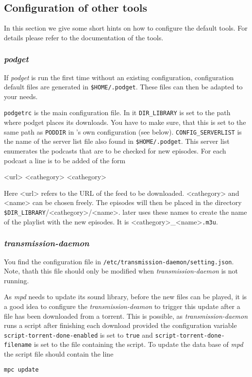 \subsection*{Configuration of other tools}
In this section we give some short hints on how to configure the
default tools. For details please refer to the documentation of the 
tools.
\subsubsection*{\emph{podget}}
If \emph{podget} is run the first time without an existing configuration, 
configuration default files are generated in  \texttt{\$HOME/.podget}.
These files can then be adapted to your needs.

\texttt{podgetrc} is the main configuration file.
In it \texttt{DIR\_LIBRARY} is set to the path where
podget places its downloads.
You have to make sure, that this is set to the  same path  as \texttt{PODDIR}
in  \podgetbt{}'s own configuration (see  below).
\texttt{CONFIG\_SERVERLIST} is the name of the server list file
also found in \texttt{\$HOME/.podget}.
This server list enumerates the podcasts that are 
to be checked for new episodes.
For each podcast a line is to be added of the form

\textless{}url\textgreater{} \textless{}cathegory\textgreater{} 
\textless{}cathegory\textgreater{} 

\noindent\sloppy
Here \textless{}url\textgreater{} refers to the URL of the  feed to be downloaded. 
\textless{}cathegory\textgreater{} and \textless{}name\textgreater{} can be chosen freely. 
The episodes will then be placed in the directory
\texttt{\$DIR\_LIBRARY}/\textless{}cathegory\textgreater{}/\textless{}name\textgreater{}.
\podgetbt{} later uses these names  to create the name 
of the playlist with the new episodes.
It is \textless{}cathegory\textgreater{}\_\textless{}name\textgreater{}\texttt{.m3u}.


\subsubsection*{\emph{transmission-daemon}}
\sloppy
You find the configuration file in \texttt{/etc/transmission-daemon/setting.json}.
Note, thath this file should only be modified when \emph{transmission-daemon}
is not running.

As \emph{mpd} needs to update its sound library, before the new
files can be played, it is a good idea to configure the 
\emph{transmission-deamon} to trigger this update after
a file has been downloaded from a torrent.
This is possible, as
\emph{transmission-daemon} runs a script after finishing each download
provided the configuration variable 
\texttt{script-torrent-done-enabled} is set to \texttt{true}
and \texttt{script-torrent-done-filename} is set to the file containing the script. To update the data base of \emph{mpd} the script file 
should  contain the line
\begin{verbatim}
mpc update
\end{verbatim}


